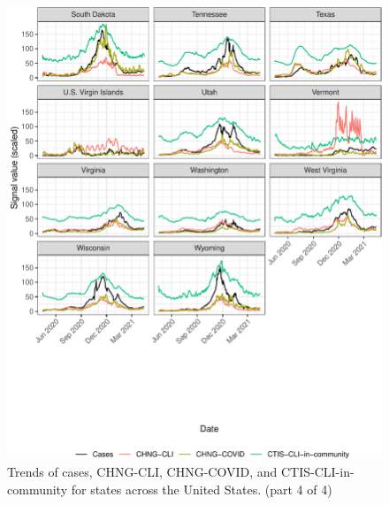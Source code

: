 \documentclass[9pt,twoside,lineno]{pnas-new}
\begin{document}
\begin{figure}

{\centering \includegraphics[width=\textwidth]{fig/state-trend-grids-4-1} 

}

\caption{Trends of cases, CHNG-CLI, CHNG-COVID, and CTIS-CLI-in-community for states across the United States. (part 4 of 4)}\label{fig:state-trend-grids-4}
\end{figure}

\clearpage
\end{document}
